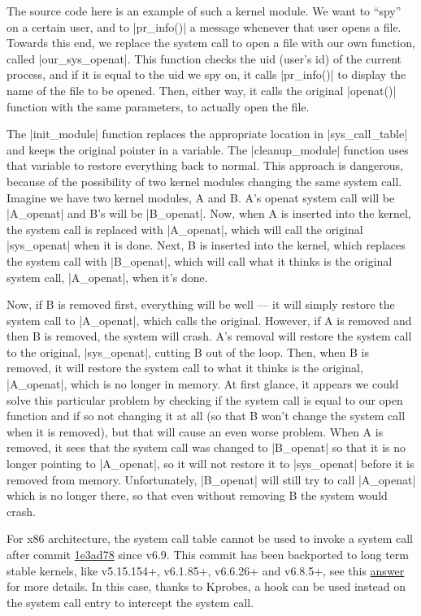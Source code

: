 \documentclass[10pt, oneside]{book}
\begin{document}
The source code here is an example of such a kernel module.
We want to ``spy'' on a certain user, and to \cpp|pr_info()| a message whenever that user opens a file.
Towards this end, we replace the system call to open a file with our own function, called \cpp|our_sys_openat|.
This function checks the uid (user's id) of the current process, and if it is equal to the uid we spy on, it calls \cpp|pr_info()| to display the name of the file to be opened.
Then, either way, it calls the original \cpp|openat()| function with the same parameters, to actually open the file.

The \cpp|init_module| function replaces the appropriate location in \cpp|sys_call_table| and keeps the original pointer in a variable.
The \cpp|cleanup_module| function uses that variable to restore everything back to normal.
This approach is dangerous, because of the possibility of two kernel modules changing the same system call.
Imagine we have two kernel modules, A and B. A's openat system call will be \cpp|A_openat| and B's will be \cpp|B_openat|.
Now, when A is inserted into the kernel, the system call is replaced with \cpp|A_openat|, which will call the original \cpp|sys_openat| when it is done.
Next, B is inserted into the kernel, which replaces the system call with \cpp|B_openat|, which will call what it thinks is the original system call, \cpp|A_openat|, when it's done.

Now, if B is removed first, everything will be well --- it will simply restore the system call to \cpp|A_openat|, which calls the original.
However, if A is removed and then B is removed, the system will crash.
A's removal will restore the system call to the original, \cpp|sys_openat|, cutting B out of the loop.
Then, when B is removed, it will restore the system call to what it thinks is the original, \cpp|A_openat|, which is no longer in memory.
At first glance, it appears we could solve this particular problem by checking if the system call is equal to our open function and if so not changing it at all (so that B won't change the system call when it is removed), but that will cause an even worse problem.
When A is removed, it sees that the system call was changed to \cpp|B_openat| so that it is no longer pointing to \cpp|A_openat|, so it will not restore it to \cpp|sys_openat| before it is removed from memory.
Unfortunately, \cpp|B_openat| will still try to call \cpp|A_openat| which is no longer there, so that even without removing B the system would crash.

For x86 architecture, the system call table cannot be used to invoke a system call after commit
\href{https://git.kernel.org/pub/scm/linux/kernel/git/torvalds/linux.git/commit/?id=1e3ad78334a69b36e107232e337f9d693dcc9df2}{1e3ad78} since v6.9.
This commit has been backported to long term stable kernels, like v5.15.154+, v6.1.85+, v6.6.26+ and v6.8.5+, see this \href{https://stackoverflow.com/a/78607015}{answer} for more details.
In this case, thanks to Kprobes, a hook can be used instead on the system call entry to intercept the system call.
\end{document}

